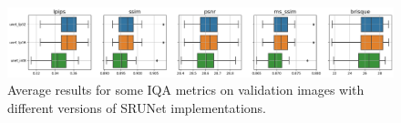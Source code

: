 \begin{figure}[h]
\includegraphics[width=1.0\textwidth]{static/2023_03_02_boxplots_metrics_quant_UNET.png}
\caption{Average results for some IQA metrics on validation images with different versions of SRUNet implementations.}
\end{figure}

\pagebreak


